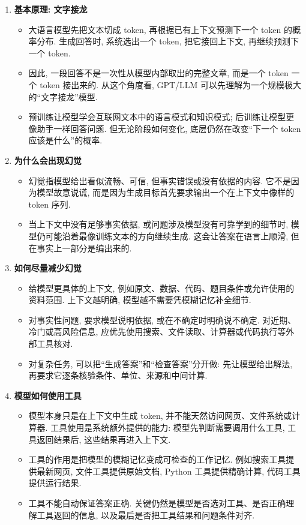\documentclass{../nndlcourse}
\begin{document}
\begin{enumerate}
    \item \textbf{基本原理: 文字接龙}
    \begin{itemize}
        \item 大语言模型先把文本切成 token, 再根据已有上下文预测下一个 token 的概率分布. 生成回答时, 系统选出一个 token, 把它接回上下文, 再继续预测下一个 token.
        \item 因此, 一段回答不是一次性从模型内部取出的完整文章, 而是一个 token 一个 token 接出来的. 从这个角度看, GPT/LLM 可以先理解为一个规模极大的“文字接龙”模型.
        \item 预训练让模型学会互联网文本中的语言模式和知识模式; 后训练让模型更像助手一样回答问题. 但无论阶段如何变化, 底层仍然在改变“下一个 token 应该是什么”的概率.
    \end{itemize}

    \item \textbf{为什么会出现幻觉}
    \begin{itemize}
        \item 幻觉指模型给出看似流畅、可信, 但事实错误或没有依据的内容. 它不是因为模型故意说谎, 而是因为生成目标首先要求输出一个在上下文中像样的 token 序列.
        \item 当上下文中没有足够事实依据, 或问题涉及模型没有可靠学到的细节时, 模型仍可能沿着最像训练文本的方向继续生成. 这会让答案在语言上顺滑, 但在事实上一部分是编出来的.
    \end{itemize}

    \item \textbf{如何尽量减少幻觉}
    \begin{itemize}
        \item 给模型更具体的上下文, 例如原文、数据、代码、题目条件或允许使用的资料范围. 上下文越明确, 模型越不需要凭模糊记忆补全细节.
        \item 对事实性问题, 要求模型说明依据, 或在不确定时明确说不确定. 对近期、冷门或高风险信息, 应优先使用搜索、文件读取、计算器或代码执行等外部工具核对.
        \item 对复杂任务, 可以把“生成答案”和“检查答案”分开做: 先让模型给出解法, 再要求它逐条核验条件、单位、来源和中间计算.
    \end{itemize}

    \item \textbf{模型如何使用工具}
    \begin{itemize}
        \item 模型本身只是在上下文中生成 token, 并不能天然访问网页、文件系统或计算器. 工具使用是系统额外提供的能力: 模型先判断需要调用什么工具, 工具返回结果后, 这些结果再进入上下文.
        \item 工具的作用是把模型的模糊记忆变成可检查的工作记忆. 例如搜索工具提供最新网页, 文件工具提供原始文档, Python 工具提供精确计算, 代码工具提供运行结果.
        \item 工具不能自动保证答案正确. 关键仍然是模型是否选对工具、是否正确理解工具返回的信息, 以及最后是否把工具结果和问题条件对齐.
    \end{itemize}

\end{enumerate}
\end{document}
